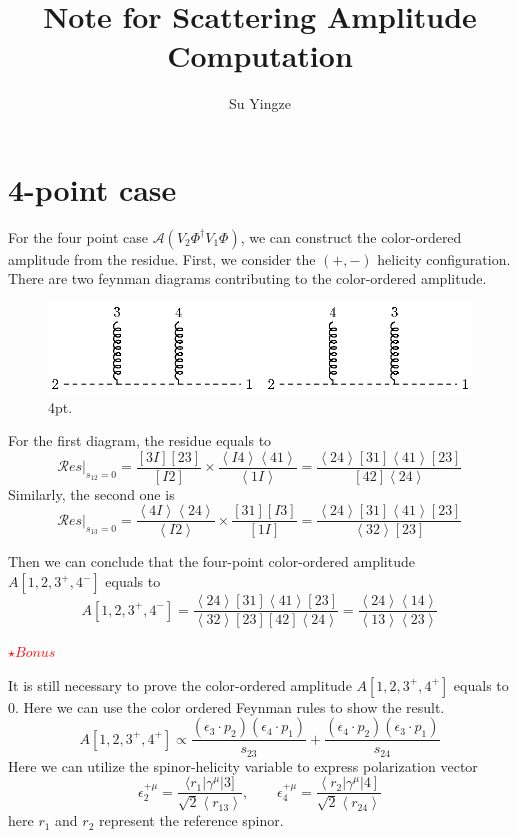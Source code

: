 \documentclass[12pt]{article}
\newcommand{\avg}[1]{\left\langle #1 \right\rangle}
\begin{document}
\title{Note for Scattering Amplitude Computation}
\author{Su Yingze}
\maketitle

\section{4-point case}
For the four point case $\mathcal{A}(V_2\Phi^\dagger V_1 \Phi )$, we can construct the color-ordered amplitude from the residue. First, we consider the $(+,-)$ helicity
configuration. There are two feynman diagrams contributing to the color-ordered amplitude.\\
\begin{figure}[htbp]
    \centering
    \includegraphics{4pt.eps}
    \caption{4pt.}
    \label{1}
\end{figure}

For the first diagram, the residue equals to
\begin{equation*}
    \mathcal{R}es|_{s_{12}=0}=\frac{[3 I ] [23]}{[I2]}\times \frac{\avg{I4}\avg{41}}{\avg{1I}}=\frac{\avg{24}[31]\avg{41}[23]}{[42]\avg{24}}
\end{equation*}
Similarly, the second one is
\begin{equation*}
    \mathcal{R}es|_{s_{13}=0}=\frac{\avg{4I}\avg{24}}{\avg{I2}}\times \frac{[31] [I3]}{[1I]}=\frac{\avg{24}[31]\avg{41}[23]}{\avg{32}[23]}
\end{equation*}

Then we can conclude that the four-point color-ordered amplitude $A[1,2,3^+,4^-]$ equals to
\begin{equation*}
    A[1,2,3^+,4^-]=\frac{\avg{24}[31]\avg{41}[23]}{\avg{32}[23][42]\avg{24}}=\frac{\avg{24}\avg{14}}{\avg{13}\avg{23}}
\end{equation*}

\textcolor{red}{$\star Bonus$}

It is still necessary to prove the color-ordered amplitude $A[1,2,3^+,4^+]$ equals to 0. Here we can use the color ordered Feynman rules to show the result.
\begin{equation*}
    A[1,2,3^+,4^+]\propto \frac{\left(\epsilon_3\cdot p_2\right)\left(\epsilon_4\cdot p_1\right)}{s_{23}}+\frac{\left(\epsilon_4\cdot p_2\right)\left(\epsilon_3\cdot p_1\right)}{s_{24}} 
\end{equation*}
Here we can utilize the spinor-helicity variable to express polarization vector
\begin{equation*}
    \epsilon_2^{+\mu}=\frac{\langle r_1 | \gamma^\mu | 3 ]}{\sqrt{2}\avg{r_13}},\qquad \epsilon_4^{+\mu}=\frac{\left <r_2|\gamma^\mu|4\right ]}{\sqrt{2}\avg{r_24}}
\end{equation*}
here $r_1$ and $r_2$ represent the reference spinor.
\end{document}
